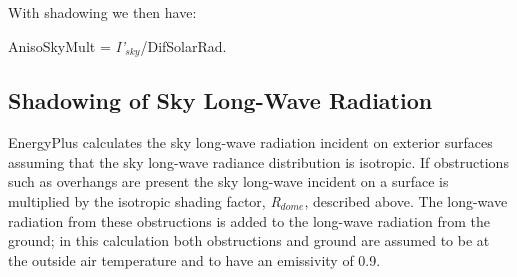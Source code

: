 With shadowing we then have:

AnisoSkyMult = \emph{I'\(_{sky}\)}/DifSolarRad.

\subsection{Shadowing of Sky Long-Wave Radiation}\label{shadowing-of-sky-long-wave-radiation}

EnergyPlus calculates the sky long-wave radiation incident on exterior surfaces assuming that the sky long-wave radiance distribution is isotropic. If obstructions such as overhangs are present the sky long-wave incident on a surface is multiplied by the isotropic shading factor, \emph{R\(_{dome}\)}, described above. The long-wave radiation from these obstructions is added to the long-wave radiation from the ground; in this calculation both obstructions and ground are assumed to be at the outside air temperature and to have an emissivity of 0.9.
